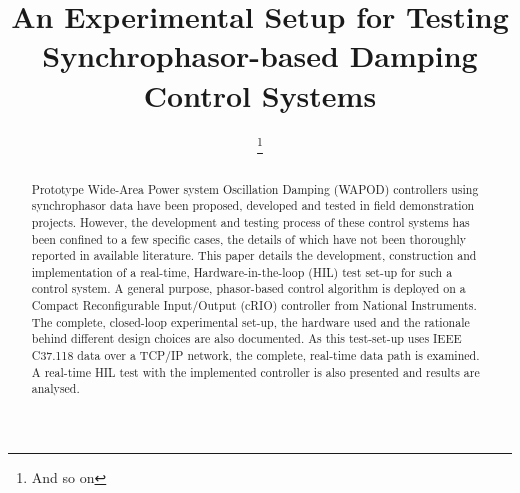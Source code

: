 \documentclass[a4paper, 10 pt, conference]{IEEEtran}
\begin{document}
\title{An Experimental Setup for Testing Synchrophasor-based Damping Control Systems}


%	

\author{
\thanks{And so on}
\and

\and
{}
}

\maketitle
\begin{abstract}
Prototype Wide-Area Power system Oscillation Damping (WAPOD) controllers using synchrophasor data have been proposed, developed and tested in field demonstration projects. However, the development and testing process of these control systems has been confined to a few specific cases, the details of which have not been thoroughly reported in available literature. This paper details the development, construction and implementation of a real-time, Hardware-in-the-loop (HIL) test set-up for such a control system. A general purpose, phasor-based control algorithm is deployed on a Compact Reconfigurable Input/Output (cRIO) controller from National Instruments. The complete, closed-loop experimental set-up, the hardware used and the rationale behind different design choices are also documented. As this test-set-up uses IEEE C37.118 data over a TCP/IP network, the complete, real-time data path is examined. A real-time HIL test with the implemented controller is also presented and results are analysed.

\end{abstract}
\end{document}
